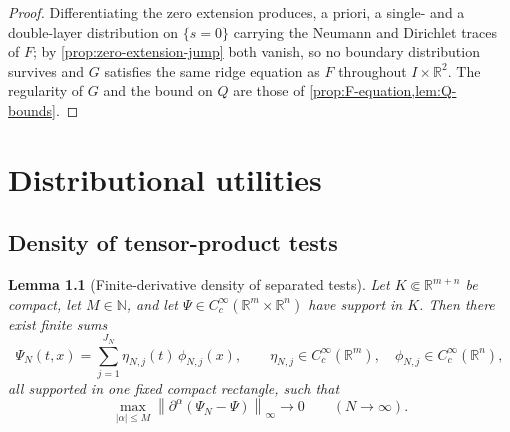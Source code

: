 \documentclass[11pt,oneside]{book}
\providecommand{\uses}[1]{}
\newtheorem{lemma}[theorem]{Lemma}
\theoremstyle{definition}
\theoremstyle{remark}
\newcommand{\R}{\mathbb R}
\newcommand{\N}{\mathbb N}
\newcommand{\1}{\mathbf 1}
\newcommand{\norm}[1]{\left\lVert #1\right\rVert}
\newcommand{\abs}[1]{\left\lvert #1\right\rvert}
\begin{document}
\begin{proof}
\uses{prop:zero-extension-jump, prop:F-equation, lem:Q-bounds}
Differentiating the zero extension produces, a priori, a single- and a double-layer distribution
on $\{s=0\}$ carrying the Neumann and Dirichlet traces of $F$; by \cref{prop:zero-extension-jump}
both vanish, so no boundary distribution survives and $G$ satisfies the same ridge equation as $F$
throughout $I\times\R^2$. The regularity of $G$ and the bound on $Q$ are those of
\cref{prop:F-equation,lem:Q-bounds}.
\end{proof}

\chapter{Distributional utilities}\label{chap:utilities}

\section{Density of tensor-product tests}

\begin{lemma}[Finite-derivative density of separated tests]
\label{lem:tensor-test-density}
Let $K\Subset\R^{m+n}$ be compact, let $M\in\N$, and let
$\Psi\in C_c^\infty(\R^m\times\R^n)$ have support in $K$. Then there exist
finite sums
\[
 \Psi_N(t,x)=\sum_{j=1}^{J_N}\eta_{N,j}(t)\,\phi_{N,j}(x),
 \qquad
 \eta_{N,j}\in C_c^\infty(\R^m),\quad
 \phi_{N,j}\in C_c^\infty(\R^n),
\]
all supported in one fixed compact rectangle, such that
\begin{equation}
 \max_{\abs{\alpha}\le M}
 \norm{\partial^\alpha(\Psi_N-\Psi)}_\infty\longrightarrow0
 \qquad(N\to\infty).
 \label{eq:tensor-test-density}
\end{equation}
\end{lemma}
\end{document}
